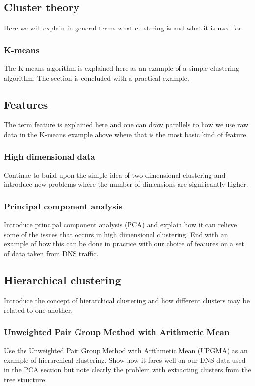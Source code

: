 \documentclass[a4paper]{report}
\begin{document}
\subsection{Cluster theory}
Here we will explain in general terms what clustering is and what it is used
for.

\subsubsection{K-means}
The K-means algorithm is explained here as an example of a simple clustering
algorithm. The section is concluded with a practical example.

\subsection{Features}
The term feature is explained here and one can draw parallels to how we use
raw data in the K-means example above where that is the most basic kind of
feature.

\subsubsection{High dimensional data}
Continue to build upon the simple idea of two dimensional clustering and
introduce new problems where the number of dimensions are significantly
higher.

\subsubsection{Principal component analysis}
Introduce principal component analysis (PCA) and explain how it can relieve
some of the issues that occurs in high dimensional clustering. End with an
example of how this can be done in practice with our choice of features on a
set of data taken from DNS traffic.

\subsection{Hierarchical clustering}
Introduce the concept of hierarchical clustering and how different clusters
may be related to one another.

\subsubsection{Unweighted Pair Group Method with Arithmetic Mean}
Use the Unweighted Pair Group Method with Arithmetic Mean (UPGMA) as an example
of hierarchical clustering. Show how it fares well on our DNS data used in the
PCA section but note clearly the problem with extracting clusters from the tree
structure.
\end{document}
